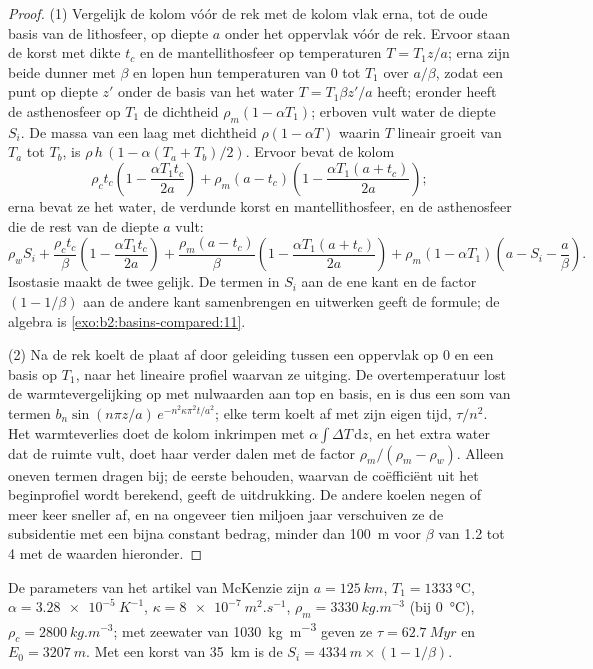 \begin{proof}
(1) Vergelijk de kolom vóór de rek met de kolom vlak erna, tot de oude basis van
de lithosfeer, op diepte $a$ onder het oppervlak vóór de rek. Ervoor staan de korst met
dikte $t_c$ en de mantellithosfeer op temperaturen $T = T_1 z/a$; erna zijn beide
dunner met $\beta$ en lopen hun temperaturen van $0$ tot $T_1$ over $a/\beta$, zodat een punt
op diepte $z'$ onder de basis van het water $T = T_1\beta z'/a$ heeft; eronder heeft de asthenosfeer op
$T_1$ de dichtheid $\rho_m(1 - \alpha T_1)$; erboven vult water de diepte $S_i$. De massa van een
laag met dichtheid $\rho(1 - \alpha T)$ waarin $T$ lineair groeit van $T_a$ tot $T_b$, is
$\rho\,h\,(1 - \alpha(T_a + T_b)/2)$. Ervoor bevat de kolom
\[
  \rho_c t_c\left(1 - \frac{\alpha T_1 t_c}{2a}\right)
  + \rho_m (a - t_c)\left(1 - \frac{\alpha T_1 (a + t_c)}{2a}\right);
\]
erna bevat ze het water, de verdunde korst en mantellithosfeer, en de asthenosfeer die
de rest van de diepte $a$ vult:
\[
  \rho_w S_i + \frac{\rho_c t_c}{\beta}\left(1 - \frac{\alpha T_1 t_c}{2a}\right)
  + \frac{\rho_m (a - t_c)}{\beta}\left(1 - \frac{\alpha T_1 (a + t_c)}{2a}\right)
  + \rho_m(1 - \alpha T_1)\left(a - S_i - \frac{a}{\beta}\right).
\]
Isostasie maakt de twee gelijk. De termen in $S_i$ aan de ene kant en de factor
$(1 - 1/\beta)$ aan de andere kant samenbrengen en uitwerken geeft de formule; de algebra is
\cref{exo:b2:basins-compared:11}.

(2) Na de rek koelt de plaat af door geleiding tussen een oppervlak op $0$ en een basis op
$T_1$, naar het lineaire profiel waarvan ze uitging. De overtemperatuur lost de
warmtevergelijking op met nulwaarden aan top en basis, en is dus een som van termen
$b_n\sin(n\pi z/a)\,e^{-n^2\kappa\pi^2 t/a^2}$; elke term koelt af met zijn eigen tijd, $\tau/n^2$. Het
warmteverlies doet de kolom inkrimpen met $\alpha\int \Delta T\,\mathrm{d}z$, en het extra water
dat de ruimte vult, doet haar verder dalen met de factor $\rho_m/(\rho_m - \rho_w)$. Alleen oneven termen
dragen bij; de eerste behouden, waarvan de coëfficiënt uit het beginprofiel wordt berekend, geeft
de uitdrukking. De andere koelen negen of meer keer sneller af, en na ongeveer tien miljoen jaar
verschuiven ze de subsidentie met een bijna constant bedrag, minder dan \qty{100}{m} voor $\beta$ van
1.2 tot 4 met de waarden hieronder.
\end{proof}

De parameters van het artikel van McKenzie zijn $a = \qty{125}{km}$, $T_1 = \qty{1333}{\celsius}$,
$\alpha = \qty{3.28e-5}{K^{-1}}$, $\kappa = \qty{8e-7}{m^2.s^{-1}}$, $\rho_m =
\qty{3330}{kg.m^{-3}}$ (bij \qty{0}{\celsius}), $\rho_c = \qty{2800}{kg.m^{-3}}$; met zeewater van
\qty{1030}{kg.m^{-3}} geven ze $\tau = \qty{62.7}{Myr}$ en $E_0 = \qty{3207}{m}$. Met een korst van
\qty{35}{km} is de  $S_i = \qty{4334}{m} \times (1 - 1/\beta)$.

